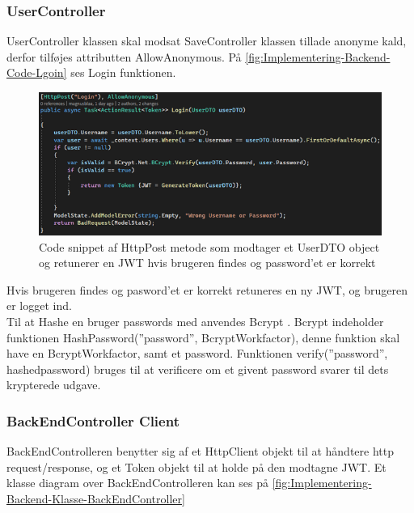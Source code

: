   
\subsubsection{UserController}

UserController klassen skal modsat SaveController klassen tillade anonyme kald, derfor tilføjes attributten AllowAnonymous. På \autoref{fig:Implementering-Backend-Code-Lgoin} ses Login funktionen.

\begin{figure}[H]
\centering
\includegraphics[width = \textwidth]{02-Body/Images/Backend_Code_Login.PNG}
\caption{Code snippet af HttpPost metode som modtager et UserDTO object og retunerer en JWT hvis brugeren findes og password’et er korrekt}
\label{fig:Implementering-Backend-Code-Lgoin}
\end{figure}

Hvis brugeren findes og pasword'et er korrekt retuneres en ny JWT, og brugeren er logget ind.\\

Til at Hashe en bruger passwords med anvendes Bcrypt \cite{Bcrypt}. Bcrypt indeholder funktionen HashPassword(”password”, BcryptWorkfactor), denne funktion skal have en BcryptWorkfactor, samt et password. Funktionen verify(”password”, hashedpassword) bruges til at verificere om et givent password svarer til dets krypterede udgave.\\


\subsubsection{BackEndController Client}

BackEndControlleren benytter sig af et HttpClient objekt til at håndtere http request/response, og et Token objekt til at holde på den modtagne JWT.
Et klasse diagram over BackEndControlleren kan ses på \autoref{fig:Implementering-Backend-Klasse-BackEndController}\\

